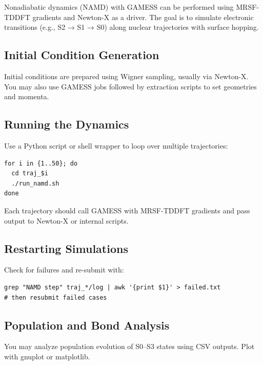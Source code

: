 Nonadiabatic dynamics (NAMD) with GAMESS can be performed using MRSF-TDDFT gradients and Newton-X as a driver. The goal is to simulate electronic transitions (e.g., S2 → S1 → S0) along nuclear trajectories with surface hopping.

\subsection*{Initial Condition Generation}

Initial conditions are prepared using Wigner sampling, usually via Newton-X. You may also use GAMESS jobs followed by extraction scripts to set geometries and momenta.

\subsection*{Running the Dynamics}

Use a Python script or shell wrapper to loop over multiple trajectories:

\begin{verbatim}
for i in {1..50}; do
  cd traj_$i
  ./run_namd.sh
done
\end{verbatim}

Each trajectory should call GAMESS with MRSF-TDDFT gradients and pass output to Newton-X or internal scripts.

\subsection*{Restarting Simulations}

Check for failures and re-submit with:

\begin{verbatim}
grep "NAMD step" traj_*/log | awk '{print $1}' > failed.txt
# then resubmit failed cases
\end{verbatim}

\subsection*{Population and Bond Analysis}

You may analyze population evolution of S0–S3 states using CSV outputs. Plot with gnuplot or matplotlib.

